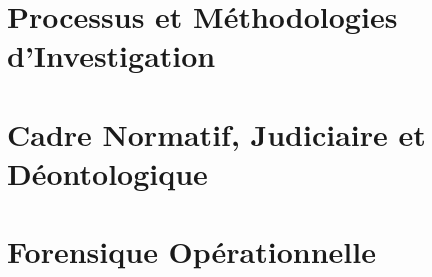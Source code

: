 \documentclass[12pt, twoside, openright, a4paper]{book}
\begin{document}
        
       
    \part{Processus et Méthodologies d'Investigation}
    \label{part:methodologie}

        
      
        
       
        
       
        
      
    \part{Cadre Normatif, Judiciaire et Déontologique}
    \label{part:normatif}

        
       
        
       
        
       
        
      
    \part{Forensique Opérationnelle}
    \label{part:forensique}
\end{document}

